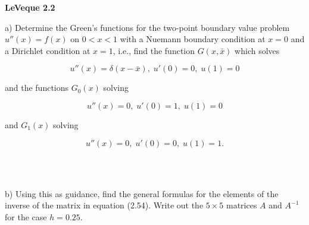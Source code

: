 \textbf{LeVeque 2.2} 

a) Determine the Green's functions for the two-point boundary value problem $u''(x) = f(x)$ on $0 < x < 1$ with a 
   Nuemann boundary condition at $x = 0$ and a Dirichlet condition at $x = 1$, i.e., find the function $G(x, \bar{x})$
   which solves

    $$
        u''(x) = \delta(x - \bar{x}),\; u'(0) = 0,\; u(1) = 0
    $$

   and the functions $G_0(x)$ solving

    $$
        u''(x) = 0,\; u'(0) = 1,\; u(1) = 0
    $$

   and $G_1(x)$ solving

    $$
        u''(x) = 0,\; u'(0) = 0,\; u(1) = 1.
    $$

\begin{solution}\ \\\\
\end{solution}

\pagebreak
b) Using this as guidance, find the general formulas for the elements of the inverse of the matrix in equation (2.54).
   Write out the $5 \times 5$ matrices $A$ and $A^{-1}$ for the case $h = 0.25$.

\begin{solution}\ \\\\
\end{solution}